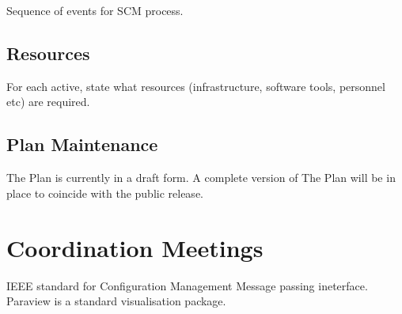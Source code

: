 \documentclass[11pt,twoside]{article}
\begin{document}
Sequence of events for SCM process.

\subsection{Resources}

For each active, state what resources (infrastructure, software tools,
personnel etc) are required.


\subsection{Plan Maintenance}

The Plan is currently in a draft form. A complete version of The Plan
will be in place to coincide with the public release.

\newpage
\section{Coordination Meetings}


\begin{thebibliography}{99}
 IEEE standard for Configuration Management
 Message passing ineterface.
 Paraview is a standard visualisation package. 
\end{thebibliography}
\end{document}
